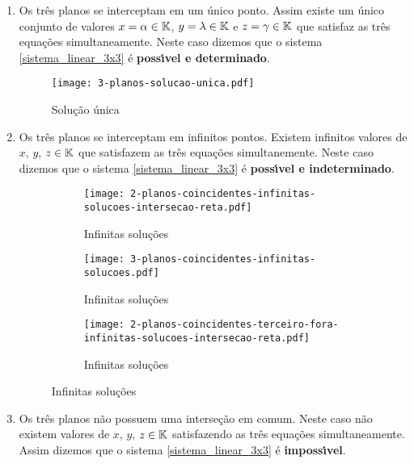 \begin{enumerate}
    \item Os tr\^es planos se interceptam em um \'unico ponto. Assim existe um \'unico conjunto de valores $x = \alpha \in \mathbb{K}$, $y = \lambda \in \mathbb{K}$ e $z = \gamma \in \mathbb{K}$  que satisfaz as tr\^es equa\c{c}\~oes simultaneamente.  Neste caso dizemos que o sistema \eqref{sistema_linear_3x3}  \'e \textbf{poss{\'\i}vel e determinado}.
        \begin{figure}[h]
            \centering
            \texttt{[image: 3-planos-solucao-unica.pdf]}
                \caption{Solu\c{c}\~ao \'unica}
        \end{figure}
    \item Os tr\^es planos se interceptam em infinitos pontos. Existem infinitos valores de $x$, $y$, $z \in \mathbb{K}$ que satisfazem as tr\^es equa\c{c}\~oes simultanemente. Neste caso dizemos que o sistema \eqref{sistema_linear_3x3} \'e \textbf{poss{\'\i}vel e indeterminado}.
        \begin{figure}[h]
            \centering
            \begin{subfigure}{.32\textwidth}
                \centering
                \texttt{[image: 2-planos-coincidentes-infinitas-solucoes-intersecao-reta.pdf]}
                \caption{Infinitas solu\c{c}\~oes}
            \end{subfigure}
            \begin{subfigure}{.32\textwidth}
                \centering
                \texttt{[image: 3-planos-coincidentes-infinitas-solucoes.pdf]}
                \caption{Infinitas solu\c{c}\~oes}
            \end{subfigure}
            \begin{subfigure}{.32\textwidth}
                \centering
                \texttt{[image: 2-planos-coincidentes-terceiro-fora-infinitas-solucoes-intersecao-reta.pdf]}
                \caption{Infinitas solu\c{c}\~oes}
            \end{subfigure}
        \end{figure}
    \item Os tr\^es planos n\~ao possuem uma interse\c{c}\~ao em comum. Neste caso n\~ao existem valores de $x$, $y$, $z \in \mathbb{K}$  satisfazendo as tr\^es equa\c{c}\~oes simultaneamente. Assim dizemos que o sistema \eqref{sistema_linear_3x3}  \'e \textbf{imposs{\'\i}vel}.
        \begin{figure}[h]
            \centering

\end{figure}
\end{enumerate}
